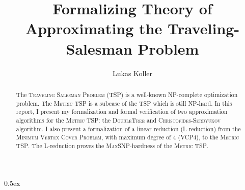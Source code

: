 \documentclass[11pt,a4paper]{article}
\begin{document}
\title{Formalizing Theory of Approximating the Traveling-Salesman Problem}
\author{Lukas Koller}
\maketitle

\begin{abstract}
  The \textsc{Traveling Salesman Problem} (\textsc{TSP}) is a well-known \textsc{NP}-complete optimization problem. The \textsc{Metric TSP} is a subcase of the \textsc{TSP} which is still \textsc{NP}-hard. In this report, I present my formalization and formal verification of two approximation algorithms for the \textsc{Metric TSP}: the \textsc{DoubleTree} and \textsc{Christofides-Serdyukov} algorithm. I also present a formalization of a linear reduction (L-reduction) from the \textsc{Minimum Vertex Cover Problem}, with maximum degree of 4 (\textsc{VCP4}), to the \textsc{Metric TSP}. The L-reduction proves the \textsc{MaxSNP}-hardness of the \textsc{Metric TSP}.
\end{abstract}

\tableofcontents

\parindent 0pt\parskip 0.5ex



% 


\end{document}
